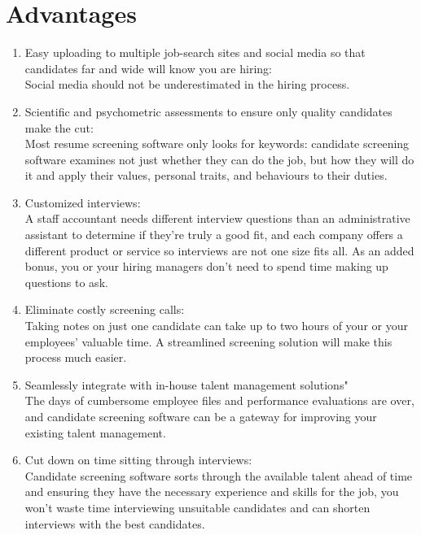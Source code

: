 \documentclass[12 pt, oneside]{book}
\begin{document}
\section{Advantages}
\begin{enumerate}

\item  Easy uploading to multiple job-search sites and social media so that candidates far and wide will know you are hiring:\\
Social media should not be underestimated in the hiring process.

\item Scientific and psychometric assessments to ensure only quality candidates make the cut:\\
Most resume screening software only looks for keywords: candidate screening software examines not just whether they can do the job, but how they will do it and apply their values, personal traits, and behaviours to their duties.

\item Customized interviews:\\
A staff accountant needs different interview questions than an administrative assistant to determine if they’re truly a good fit, and each company offers a different product or service so interviews are not one size fits all. As an added bonus, you or your hiring managers don’t need to spend time making up questions to ask.

\item Eliminate costly screening calls:\\
Taking notes on just one candidate can take up to two hours of your or your employees’ valuable time. A streamlined screening solution will make this process much easier.

\item Seamlessly integrate with in-house talent management solutions"\\
The days of cumbersome employee files and performance evaluations are over, and candidate screening software can be a gateway for improving your existing talent management.

\item Cut down on time sitting through interviews:\\
Candidate screening software sorts through the available talent ahead of time and ensuring they have the necessary experience and skills for the job, you won’t waste time interviewing unsuitable candidates and can shorten interviews with the best candidates.


\end{enumerate}
\end{document}
